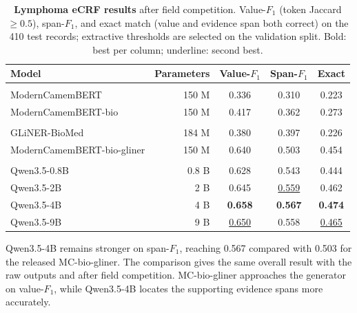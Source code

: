 \begin{table}[t]
  \centering
  \small
  \begin{threeparttable}[b]
  \begin{tabular}{@{}p{} r S S S@{}}
    \toprule
    \textbf{Model} & \textbf{Parameters} & {\textbf{Value-$F_1$}} & {\textbf{Span-$F_1$}} & {\textbf{Exact}} \\
    \midrule
     \\[1pt]
    ModernCamemBERT & 150 M & 0.336 & 0.310 & 0.223 \\
    ModernCamemBERT-bio & 150 M & 0.417 & 0.362 & 0.273 \\
    \midrule
     \\[1pt]
    GLiNER-BioMed & 184 M & 0.380 & 0.397 & 0.226 \\
    ModernCamemBERT-bio-gliner & 150 M & 0.640 & 0.503 & 0.454 \\
    \midrule
     \\[1pt]
    Qwen3.5-0.8B & 0.8 B & 0.628 & 0.543 & 0.444 \\
    Qwen3.5-2B & 2 B & 0.645 & \underline{0.559} & 0.462 \\
    Qwen3.5-4B & 4 B & \bfseries 0.658 & \bfseries 0.567 & \bfseries 0.474 \\
    Qwen3.5-9B & 9 B & \underline{0.650} & 0.558 & \underline{0.465} \\
    \bottomrule
  \end{tabular}
  \end{threeparttable}
\caption{\textbf{Lymphoma eCRF results} after field competition. Value-$F_1$
  (token Jaccard $\geq 0.5$), span-$F_1$, and exact match (value and evidence span both
  correct) on the 410 test records; extractive thresholds are selected on
  the validation split. Bold: best per column; underline: second best.}
\label{tab:p3-capstone}
\end{table}

Qwen3.5-4B remains stronger on span-$F_1$, reaching 0.567 compared with 0.503
for the released MC-bio-gliner. The comparison gives the same overall result
with the raw outputs and after field competition. MC-bio-gliner approaches the
generator on value-$F_1$, while Qwen3.5-4B locates the supporting evidence
spans more accurately.

